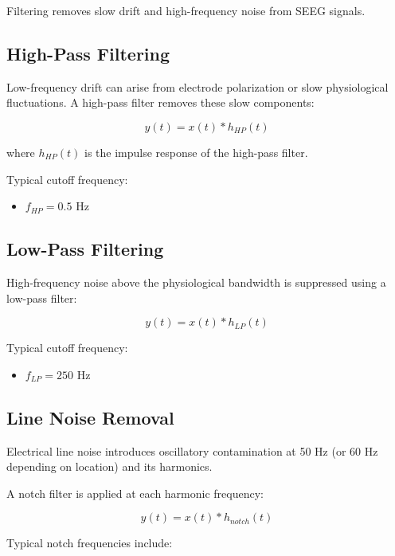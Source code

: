 \documentclass[11pt]{report}
\begin{document}
Filtering removes slow drift and high-frequency noise from SEEG signals.

\subsection{High-Pass Filtering}

Low-frequency drift can arise from electrode polarization or slow
physiological fluctuations. A high-pass filter removes these slow
components:

\begin{equation}
y(t) = x(t) * h_{HP}(t)
\end{equation}

where $h_{HP}(t)$ is the impulse response of the high-pass filter.

Typical cutoff frequency:

\begin{itemize}
\item $f_{HP} = 0.5$ Hz
\end{itemize}

\subsection{Low-Pass Filtering}

High-frequency noise above the physiological bandwidth is suppressed
using a low-pass filter:

\begin{equation}
y(t) = x(t) * h_{LP}(t)
\end{equation}

Typical cutoff frequency:

\begin{itemize}
\item $f_{LP} = 250$ Hz
\end{itemize}

\subsection{Line Noise Removal}

Electrical line noise introduces oscillatory contamination at
50 Hz (or 60 Hz depending on location) and its harmonics.

A notch filter is applied at each harmonic frequency:

\begin{equation}
y(t) = x(t) * h_{notch}(t)
\end{equation}

Typical notch frequencies include:
\end{document}
